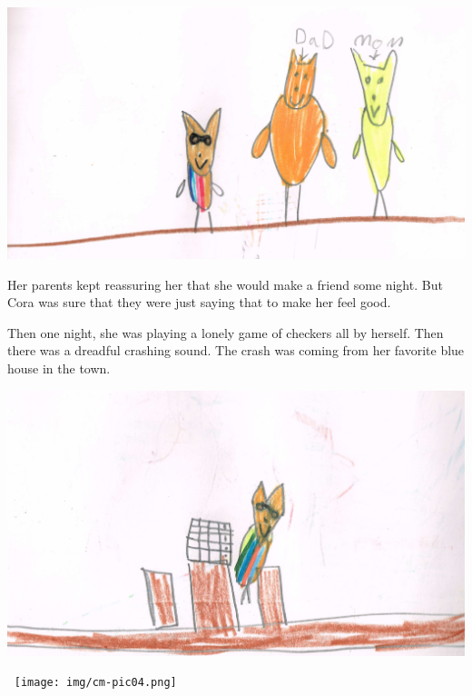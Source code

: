 \documentclass[12pt]{extbook}
\begin{document}
\begin{center}
  \includegraphics[width=\textwidth]{img/cm-pic02.png}
\end{center}
  
  Her parents kept reassuring her that she would make a friend some night.
  But Cora was sure that they were just saying that to make her feel good.

\pagebreak  

  Then one night, she was playing a lonely game of checkers all by
  herself. Then there was a dreadful crashing sound. The crash was coming
  from her favorite blue house in the town.
  
\begin{center}
  \includegraphics[width=\textwidth]{img/cm-pic03.png}
\end{center}
  
\pagebreak

  $\ $\vfill  
  \texttt{[image: img/cm-pic04.png]}
  \vfill

\pagebreak

$\ $\vspace{1cm}
\end{document}
